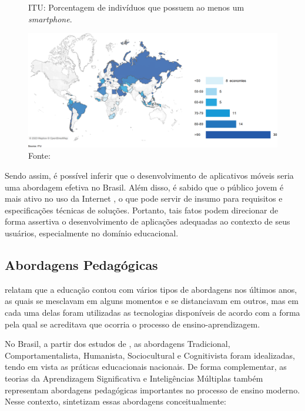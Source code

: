 \begin{figure}[htbp]
\caption{ITU: Porcentagem de indivíduos que possuem ao menos um \textit{smartphone}.}
\label{fig:itu-donos-smartphones}
\centerline{\includegraphics[width=1\textwidth]{images/itu-individuals-owning-mobile-phone.png}}
\caption*{Fonte: }
\end{figure}

Sendo assim, é possível inferir que o desenvolvimento de aplicativos móveis seria uma abordagem efetiva no Brasil. Além disso, é sabido que o público jovem é mais ativo no uso da Internet \cite{Itu2020}, o que pode servir de insumo para requisitos e especificações técnicas de soluções. Portanto, tais fatos podem direcionar de forma assertiva o desenvolvimento de aplicações adequadas ao contexto de seus usuários, especialmente no domínio educacional.%

\subsection{Abordagens Pedagógicas}
\label{fundamentacao-teorica:tic:educacao}

 relatam que a educação contou com vários tipos de abordagens nos últimos anos, as quais se mesclavam em alguns momentos e se distanciavam em outros, mas em cada uma delas foram utilizadas as tecnologias disponíveis de acordo com a forma pela qual se acreditava que ocorria o processo de ensino-aprendizagem.

No Brasil, a partir dos estudos de , as abordagens Tradicional, Comportamentalista, Humanista, Sociocultural e Cognitivista foram idealizadas, tendo em vista as práticas educacionais nacionais. De forma complementar, as teorias da Aprendizagem Significativa \cite{Ausubel1980} e Inteligências Múltiplas \cite{Gardner1995} também representam abordagens pedagógicas importantes no processo de ensino moderno. Nesse contexto,  sintetizam essas abordagens conceitualmente:

